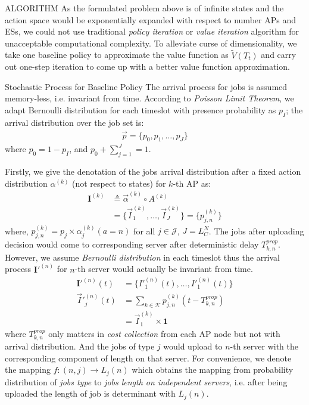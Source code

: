 \documentclass[10pt, conference, letterpaper]{IEEEtran}
\newcommand{\vecOne}{\mathbf{1}}
\begin{document}
    \begin{section}{ALGORITHM}
        \label{sec:algorithm}
        As the formulated problem above is of infinite states and the action space would be exponentially expanded with respect to number APs and ESs, we could not use traditional \emph{policy iteration} or \emph{value iteration} algorithm \cite{sutton1998introduction} for unacceptable computational complexity. To alleviate curse of dimensionality, we take one baseline policy to approximate the value function as $\tilde{V}(T_t)$ and carry out one-step iteration to come up with a better value function approximation.

        \begin{subsection}{Stochastic Process for Baseline Policy}
            The arrival process for jobs is assumed memory-less, i.e. invariant from time. According to \emph{Poisson Limit Theorem}, we adapt Bernoulli distribution for each timeslot with presence probability as $p_I$; the arrival distribution over the job set is:
            \begin{align*}
                \vec{p} = \{ p_0, p_1,\dots,p_J \}
            \end{align*}
            where $p_0=1-p_I$, and $p_0+\sum_{j=1}^{J}=1$.

            Firstly, we give the denotation of the jobs arrival distribution after a fixed action distribution $\alpha^{(k)}$ (not respect to states) for $k$-th AP as:
            \begin{align}
                \mathbf{I}^{(k)} &\triangleq \vec{\alpha}^{(k)} \circ A^{(k)}
                \nonumber\\
                &= \{ \vec{I}^{(k)}_{1}, \dots, \vec{I}^{(k)}_{J} \} = \{p^{(k)}_{j,n}\}
            \end{align}
            where, $p^{(k)}_{j,n} = p_j \times \alpha^{(k)}_j(a=n)$ for all $j \in \mathcal{J}$, $J=L_C^N$.
            The jobs after uploading decision would come to corresponding server after deterministic delay $T^{prop}_{k,n}$. However, we assume \emph{Bernoulli distribution} in each timeslot thus the arrival process $\mathbf{I}'^{(n)}$ for $n$-th server would actually be invariant from time.
            \begin{align}
                \mathbf{I}'^{(n)}(t) & = \{I'^{(n)}_1(t), \dots, I'^{(n)}_1(t) \}
                \\
                \vec{I}'^{(n)}_j(t) & = \sum_{k \in \mathcal{K}} p^{(k)}_{j,n}(t - T^{prop}_{k,n})
                \nonumber\\
                & = \vec{I}^{(k)}_{1} \times \vecOne
            \end{align}
            where $T^{prop}_{k,n}$ only matters in \emph{cost collection} from each AP node but not with arrival distribution. And the jobs of type $j$ would upload to $n$-th server with the corresponding component of length on that server. For convenience, we denote the mapping $f: (n,j) \to L_j(n)$ which obtains the mapping from probability distribution of \emph{jobs type} to \emph{jobs length on independent servers}, i.e. after being uploaded the length of job is determinant with $L_j(n)$.


\end{subsection}
\end{section}
\end{document}
